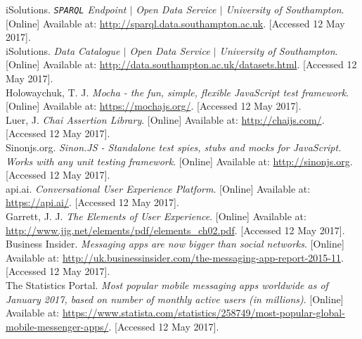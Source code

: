 \documentclass[journal, a4paper]{IEEEtran}
\begin{document}
\begin{thebibliography}{5}

    iSolutions. 
    \emph{\texttt{SPARQL} Endpoint $\vert$ Open Data Service $\vert$ University of Southampton}. 
    [Online] Available at: 
    \url{http://sparql.data.southampton.ac.uk}.
    [Accessed 12 May 2017].\\
    
    iSolutions.
    \emph{Data Catalogue $\vert$ Open Data Service $\vert$ University of Southampton}.
    [Online] Available at:
    \url{http://data.southampton.ac.uk/datasets.html}.
    [Accessed 12 May 2017].\\
    
    Holowaychuk, T. J.
    \emph{Mocha - the fun, simple, flexible JavaScript test framework}.
    [Online] Available at:
    \url{https://mochajs.org/}.
    [Accessed 12 May 2017].\\
    
    Luer, J.
    \emph{Chai Assertion Library}.
    [Online] Available at:
    \url{http://chaijs.com/}.
    [Accessed 12 May 2017].\\
    
    Sinonjs.org.
    \emph{Sinon.JS - Standalone test spies, stubs and mocks for JavaScript. Works with any unit testing framework}.
    [Online] Available at:
    \url{http://sinonjs.org}.
    [Accessed 12 May 2017].\\
    
    api.ai.
    \emph{Conversational User Experience Platform}.
    [Online] Available at:
    \url{https://api.ai/}.
    [Accessed 12 May 2017].\\
    
    Garrett, J. J.
    \emph{The Elements of User Experience}.
    [Online] Available at:
    \url{http://www.jjg.net/elements/pdf/elements_ch02.pdf}.
    [Accessed 12 May 2017].\\
    
    Business Insider.
    \emph{Messaging apps are now bigger than social networks}.
    [Online] Available at:
    \url{http://uk.businessinsider.com/the-messaging-app-report-2015-11}.
    [Accessed 12 May 2017].\\
        
    The Statistics Portal.
    \emph{Most popular mobile messaging apps worldwide as of January 2017, based on number of monthly active users (in millions)}.
    [Online] Available at:
    \url{https://www.statista.com/statistics/258749/most-popular-global-mobile-messenger-apps/}.
    [Accessed 12 May 2017].\\
    

\end{thebibliography}
\end{document}
